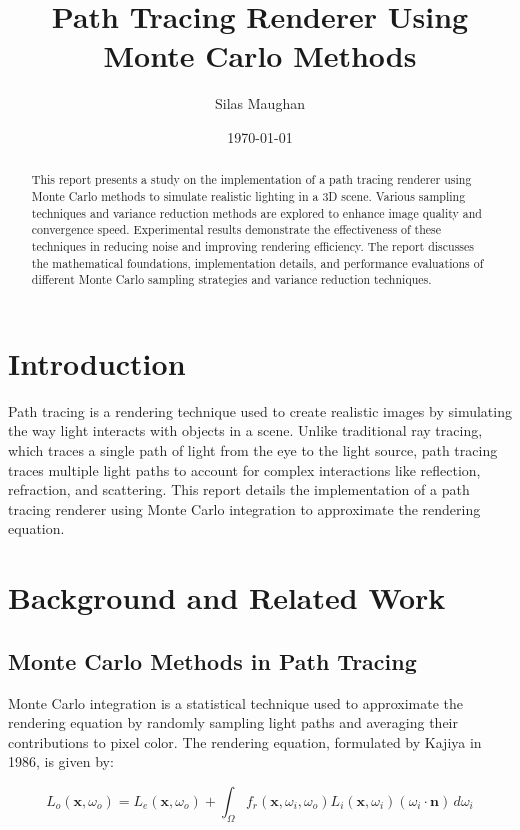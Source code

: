 \documentclass[12pt]{article}
\title{Path Tracing Renderer Using Monte Carlo Methods}
\author{Silas Maughan}
\date{\today}
\begin{document}
\maketitle

\begin{abstract}
    This report presents a study on the implementation of a path tracing renderer using Monte Carlo methods to simulate realistic lighting in a 3D scene. Various sampling techniques and variance reduction methods are explored to enhance image quality and convergence speed. Experimental results demonstrate the effectiveness of these techniques in reducing noise and improving rendering efficiency. The report discusses the mathematical foundations, implementation details, and performance evaluations of different Monte Carlo sampling strategies and variance reduction techniques.
\end{abstract}

\tableofcontents

\section{Introduction}
\label{sec:intro}
Path tracing is a rendering technique used to create realistic images by simulating the way light interacts with objects in a scene. Unlike traditional ray tracing, which traces a single path of light from the eye to the light source, path tracing traces multiple light paths to account for complex interactions like reflection, refraction, and scattering. This report details the implementation of a path tracing renderer using Monte Carlo integration to approximate the rendering equation.

\section{Background and Related Work}
\label{sec:background}
\subsection{Monte Carlo Methods in Path Tracing}
Monte Carlo integration is a statistical technique used to approximate the rendering equation by randomly sampling light paths and averaging their contributions to pixel color. The rendering equation, formulated by Kajiya in 1986, is given by:

\begin{equation}
    L_o(\mathbf{x}, \omega_o) = L_e(\mathbf{x}, \omega_o) + \int_{\Omega} f_r(\mathbf{x}, \omega_i, \omega_o) L_i(\mathbf{x}, \omega_i) (\omega_i \cdot \mathbf{n}) \, d\omega_i
\end{equation}
\end{document}
